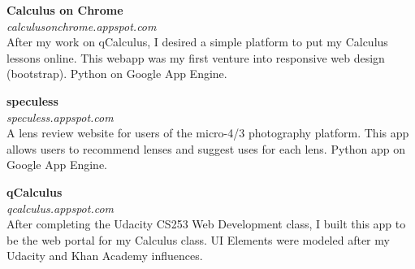\documentclass{article}
\begin{document}
\begin{multicols}{3}

{\bfseries Calculus on Chrome } \\
\textit{calculusonchrome.appspot.com} \\
After my work on qCalculus, I desired a simple platform to put my Calculus lessons online. This webapp was my first venture into responsive web design (bootstrap). Python on Google App Engine.  

\columnbreak

{\bfseries speculess} \\
\textit{speculess.appspot.com} \\
A lens review website for users of the micro-4/3 photography platform. This app allows users to recommend lenses and suggest uses for each lens. Python app on Google App Engine. 

\columnbreak

{\bfseries qCalculus} \\
\textit{qcalculus.appspot.com} \\
After completing the Udacity CS253 Web Development class, I built this app to be the web portal for my Calculus class. UI Elements were modeled after my Udacity and Khan Academy influences. 

\end{multicols}
\end{document}
